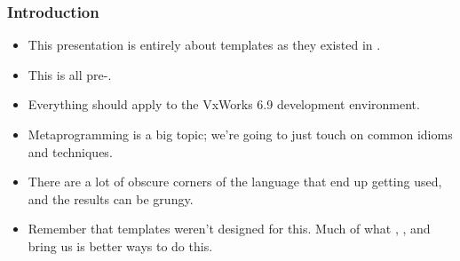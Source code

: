 \begin{frame}[fragile,t]
\frametitle{Introduction}
\begin{itemize}[<+->]
\item This presentation is entirely about templates as they existed in
.
\vskip 12pt
\item This is all pre-.
\vskip 12pt

\item Everything should apply to the VxWorks 6.9 development
  environment.

\vskip 12pt

\item Metaprogramming is a big topic; we're going to just touch on
  common idioms and techniques.
\vskip 12pt
\item There are a lot of obscure corners of the language that end up
  getting used, and the results can be grungy.
\vskip 12pt
\item Remember that templates weren't designed for this. Much of what
  , , and  bring us is better ways to do this. 
\end{itemize}


\end{frame}
